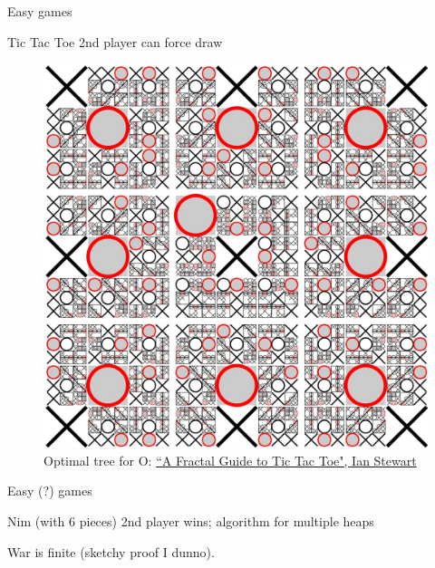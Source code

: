 \documentclass[compress]{beamer}
\newcommand{\bblue}[1]{\textcolor{NordBrightBlue}{#1}}
\newcommand{\red}[1]{\textcolor{NordRed}{#1}}
\begin{document}
\begin{frame}{Easy games}

\bblue{Tic Tac Toe} 2nd player can force draw
\begin{figure}
    \centering
    \includegraphics[scale = 0.16]{img/tic_tac_toe.jpg}
    \caption{Optimal tree for O: \href{https://en.wikipedia.org/wiki/Tic-tac-toe\#/media/File:Tictactoe-O.svg}{``A Fractal Guide to Tic Tac Toe", Ian Stewart}}
    \label{fig:tic_tac_toe}
\end{figure}
\end{frame}

\begin{frame}{Easy (?) games}

{\Huge \red{  \symbol{"26C2} \symbol{"26C2} \symbol{"26C2} \symbol{"26C2} \symbol{"26C2}}  }

\bigskip

\bblue{Nim (with 6 pieces)} 2nd player wins; algorithm for multiple heaps

\bigskip

\bblue{War} is finite (sketchy proof I dunno).
\smallskip
\end{frame}
\end{document}
